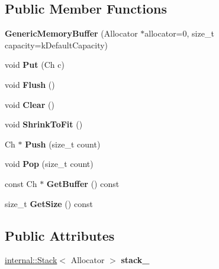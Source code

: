 \subsection*{Public Member Functions}
\begin{DoxyCompactItemize}
\item 
\mbox{\label{struct_generic_memory_buffer_ad08f7da47bca43fcdb0c3b10e22dfa1d}} 
{\bfseries Generic\+Memory\+Buffer} (Allocator $\ast$allocator=0, size\+\_\+t capacity=k\+Default\+Capacity)
\item 
\mbox{\label{struct_generic_memory_buffer_a9dfb477983e211893601f8ab637b42d8}} 
void {\bfseries Put} (Ch c)
\item 
\mbox{\label{struct_generic_memory_buffer_a9861181cab6f5bec2ec08b601aa53575}} 
void {\bfseries Flush} ()
\item 
\mbox{\label{struct_generic_memory_buffer_a036cbe2556778e1edc525602a9821df2}} 
void {\bfseries Clear} ()
\item 
\mbox{\label{struct_generic_memory_buffer_a3b87deb9bf34c394c8fb262ab53c0c4b}} 
void {\bfseries Shrink\+To\+Fit} ()
\item 
\mbox{\label{struct_generic_memory_buffer_a56f7b14d2940b682fe592f598d6792ec}} 
Ch $\ast$ {\bfseries Push} (size\+\_\+t count)
\item 
\mbox{\label{struct_generic_memory_buffer_a82a6706286f1356e1769282f5d496005}} 
void {\bfseries Pop} (size\+\_\+t count)
\item 
\mbox{\label{struct_generic_memory_buffer_a8d7be8b1d64285b787571541a7c4bb37}} 
const Ch $\ast$ {\bfseries Get\+Buffer} () const
\item 
\mbox{\label{struct_generic_memory_buffer_aaab1f18d03109ab01213d3e3d8368ff9}} 
size\+\_\+t {\bfseries Get\+Size} () const
\end{DoxyCompactItemize}
\subsection*{Public Attributes}
\begin{DoxyCompactItemize}
\item 
\mbox{\label{struct_generic_memory_buffer_a977b479180bebe8ae14ca1c11d52a486}} 
\hyperlink{classinternal_1_1_stack}{internal\+::\+Stack}$<$ Allocator $>$ {\bfseries stack\+\_\+}
\end{DoxyCompactItemize}
